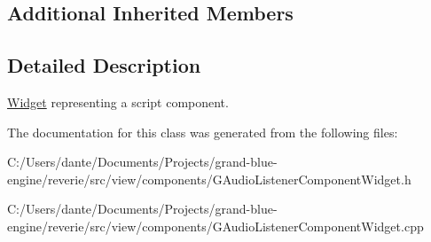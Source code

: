 \subsection*{Additional Inherited Members}


\subsection{Detailed Description}
\mbox{\hyperlink{class_widget}{Widget}} representing a script component. 

The documentation for this class was generated from the following files\+:\begin{DoxyCompactItemize}
\item 
C\+:/\+Users/dante/\+Documents/\+Projects/grand-\/blue-\/engine/reverie/src/view/components/G\+Audio\+Listener\+Component\+Widget.\+h\item 
C\+:/\+Users/dante/\+Documents/\+Projects/grand-\/blue-\/engine/reverie/src/view/components/G\+Audio\+Listener\+Component\+Widget.\+cpp\end{DoxyCompactItemize}
